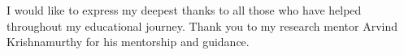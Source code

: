 I would like to express my deepest thanks to all those who have helped throughout my educational journey.
Thank you to my research mentor Arvind Krishnamurthy for his mentorship and guidance. 
